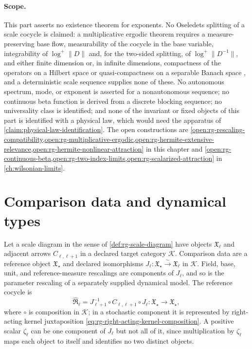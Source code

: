 \paragraph{Scope.}
This part asserts no existence theorem for exponents. No Oseledets splitting
of a scale cocycle is claimed: a multiplicative ergodic theorem
\citep{Oseledets1968} requires a measure-preserving base flow, measurability of
the cocycle in the base variable, integrability of \(\log^+\lVert D\rVert\)
and, for the two-sided splitting, of \(\log^+\lVert D^{-1}\rVert\), and either
finite dimension \citep[Chapters~3 and~4]{Arnold1998} or, in infinite
dimensions, compactness of the operators on a Hilbert space
\citep{Ruelle1982} or quasi-compactness on a separable Banach space
\citep{LianLu2010}, and a deterministic scale sequence supplies none of these.
No autonomous spectrum, mode, or exponent is asserted for a nonautonomous
sequence; no continuous beta function is derived from a discrete blocking
sequence; no universality class is identified; and none of the invariant or
fixed objects of this part is identified with a physical law, which would
need the apparatus of \cref{claim:physical-law-identification}.
The open constructions are
\cref{open:rg-rescaling-compatibility,open:rg-multiplicative-ergodic,open:rg-hermite-extensive-relevance,open:rg-hermite-nonlinear-attraction}
in this chapter and
\cref{open:rg-continuous-beta,open:rg-two-index-limits,open:rg-scalarized-attraction}
in \cref{ch:wilsonian-limits}.

\section{Comparison data and dynamical types}
\label{sec:rg-dynamical-types}

Let a scale diagram in the sense of \cref{def:rg-scale-diagram} have objects
\(\mathfrak X_\ell\) and adjacent arrows \(C_{\ell,\ell+1}\) in a declared
target category \(\mathscr K\). Comparison data are a reference object
\(\mathfrak X_\star\) and declared isomorphisms
\(J_\ell:\mathfrak X_\star\xrightarrow{\sim}\mathfrak X_\ell\) in
\(\mathscr K\). Field, base, unit, and reference-measure rescalings are
components of \(J_\ell\), and so is the parameter rescaling of a separately
supplied dynamical model. The reference cocycle is
\begin{equation}
\widehat{\mathfrak R}_\ell
=J_{\ell+1}^{-1}\circ C_{\ell,\ell+1}\circ J_\ell:
\mathfrak X_\star\longrightarrow\mathfrak X_\star,
\label{eq:rg-reference-cocycle}
\end{equation}
where \(\circ\) is composition in \(\mathscr K\); in a stochastic component it
is represented by right-acting kernel juxtaposition
\eqref{eq:rg-right-acting-kernel-composition}. A positive scalar
\(\zeta_\ell\) can be one component of \(J_\ell\) but not all of it, since
multiplication by \(\zeta_\ell\) maps each object to itself and identifies no
two distinct objects.

